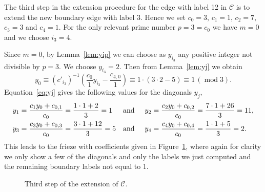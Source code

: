 \documentclass[10pt]{amsart}
\numberwithin{equation}{section}
\theoremstyle{definition}
\theoremstyle{remark}
\DeclareMathOperator{\md}{mod}
\begin{document}

The third step in the extension procedure for the edge with label 12 in $\mathcal{C}$ 
is to extend the new boundary edge with label $3$. Hence we set $c_0=3$, $c_1=1$, $c_2=7$,
$c_3=3$ and $c_4=1$. For the only relevant prime number $p=3=c_0$
we have $m=0$ and we choose $i_3=4$. 

Since $m=0$, by 
Lemma~\ref{lem:yip} we can choose as $y_{i_3}$ any positive integer 
not divisible by $p=3$. We choose 
$y_{i_3}=2$. Then from Lemma~\ref{lem:yj} we obtain
\[
y_0 \equiv (c'_{i_3})^{-1} \left( \frac{c_0}{1} y_{i_3} - \frac{c_{4,0}}{1}\right)
\equiv 1\cdot (3\cdot 2-5) \equiv 1\,(\md 3).
\]
Equation~\eqref{eq:yj} gives the following values for the diagonals $y_j$, 
\begin{align*}
y_1&=\frac{c_1y_0+c_{0,1}}{c_0} = \frac{1\cdot 1 +2}{3} = 1
&\mbox{and}\hskip0.5cm
y_2&=\frac{c_2y_0+c_{0,2}}{c_0} = \frac{7\cdot 1 +26}{3} = 11,
\\
y_3&=\frac{c_3y_0+c_{0,3}}{c_0} = \frac{3\cdot 1 +12}{3} = 5
&\mbox{and}\hskip0.5cm
y_4&=\frac{c_4y_0+c_{0,4}}{c_0} = \frac{1\cdot 1 +5}{3} = 2.
\end{align*}
This leads to the frieze with coefficients given in Figure~\ref{fig:fwcext3},
where again for clarity we only show a few of the diagonals and only the labels
we just computed and the remaining boundary labels not equal to 1.



\begin{figure}[htb]\centering
{}
 
 \vspace*{-3mm}
 \caption{Third step of the extension of $\mathcal{C}$.
 \label{fig:fwcext3}}
\end{figure}
\end{document}
